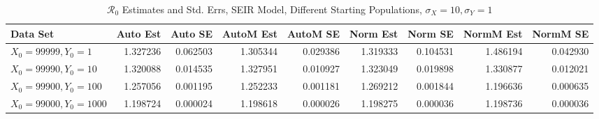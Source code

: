 \documentclass[12pt]{article}
\newcommand{\rr}{\ensuremath{\mathcal{R}_0}}
\begin{document}
\begin{table}[H]
	
	\caption{$\rr$ Estimates and Std. Errs, SEIR Model,
		Different Starting Populations, 
		$\sigma_X = 10, \sigma_Y = 1$}
	\begin{footnotesize}
		\hskip -1.7cm
		\begin{tabular}{l|r|r|r|r|r|r|r|r}
			\hline
			Data Set & Auto Est & Auto SE & AutoM Est & AutoM SE & Norm Est & Norm SE & NormM Est & NormM SE\\
			\hline
			$X_0 = 99999, Y_0 = 1$ & 1.327236 & 0.062503 & 1.305344 & 0.029386 & 1.319333 & 0.104531 & 1.486194 & 0.042930\\
			\hline
			$X_0 = 99990, Y_0 = 10$ & 1.320088 & 0.014535 & 1.327951 & 0.010927 & 1.323049 & 0.019898 & 1.330877 & 0.012021\\
			\hline
			$X_0 = 99900, Y_0 = 100$ & 1.257056 & 0.001195 & 1.252233 & 0.001181 & 1.269212 & 0.001844 & 1.196636 & 0.000635\\
			\hline
			$X_0 = 99000, Y_0 = 1000$ & 1.198724 & 0.000024 & 1.198618 & 0.000026 & 1.198275 & 0.000036 & 1.198736 & 0.000036\\
			\hline
		\end{tabular}
	\end{footnotesize}
\end{table}
\end{document}
